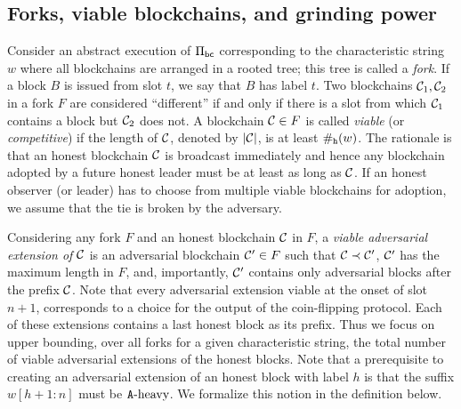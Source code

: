 




\subsection{Forks, viable blockchains, and grinding power}

Consider an abstract execution of $\Pi_\mathsf{bc}$ 
corresponding to the characteristic string $w$ 
where 
all blockchains are arranged in a rooted tree; 
this tree is called a \emph{fork}. 
If a block $B$ is issued from slot $t$, 
we say that $B$ has label $t$.
Two blockchains $\mathcal{C}_1, \mathcal{C}_2$ in a fork $F$ are considered ``different'' 
if and only if there is a slot from which 
$\mathcal{C}_1$ contains a block but $\mathcal{C}_2$ does not. 
A blockchain $\mathcal{C} \in F$ is called \emph{viable} (or \emph{competitive}) 
if the length of $\mathcal{C}$, denoted by $|\mathcal{C}|$, 
is at least $\#_{\mathtt{h}}(w)$. 
The rationale is that an honest blockchain $\mathcal{C}$ is broadcast immediately 
and hence any blockchain adopted by a future honest leader
must be at least as long as $\mathcal{C}$. 
If an honest observer (or leader) has to choose from multiple viable blockchains for adoption, 
we assume that the tie is broken by the adversary. 

Considering any fork $F$ and an honest blockchain $\mathcal{C}$ in $F$, 
a \emph{viable adversarial extension of $\mathcal{C}$} 
is an adversarial blockchain $\mathcal{C}' \in F$ 
such that $\mathcal{C} \prec \mathcal{C}'$, 
$\mathcal{C}'$ has the maximum length in $F$, 
and, importantly, $\mathcal{C}'$ contains only adversarial blocks after the prefix $\mathcal{C}$. 
Note that every adversarial extension 
viable at the onset of slot $n + 1$, 
corresponds to a choice 
for the output of the coin-flipping protocol. 
Each of these extensions contains a last honest block as its prefix. 
Thus we focus on upper bounding, 
over all forks for a given characteristic string, 
the total number of viable adversarial extensions 
of the honest blocks.
Note that a prerequisite to creating an adversarial extension 
of an honest block with label $h$ is that 
the suffix $w[h + 1 : n]$ must be $\mathtt{A}\text{-heavy}$.
We formalize this notion in the definition below.

